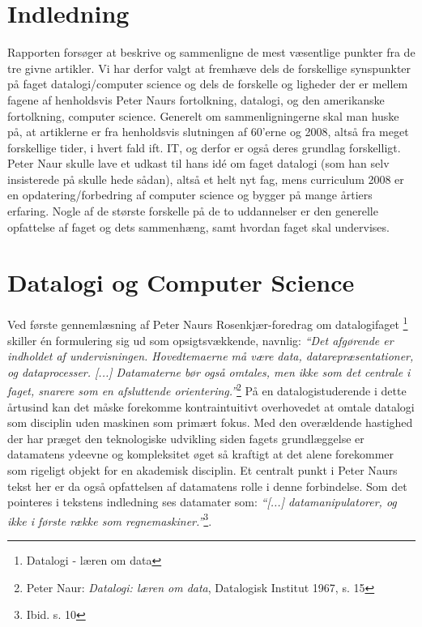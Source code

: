 \documentclass[10pt,a4paper]{article}
\newcommand{\citat}[2]{\vspace{0.1cm}\newline\textit{``#1''}\hspace{0.1cm}\footnote{#2}\vspace{0.1cm}\newline}
\begin{document}
\section{Indledning}
Rapporten forsøger at beskrive og sammenligne de mest væsentlige punkter fra de
tre givne artikler. Vi har derfor valgt at fremhæve dels de forskellige
synspunkter på faget datalogi/computer science og dels de forskelle og ligheder
der er mellem fagene af henholdsvis Peter Naurs fortolkning, datalogi, og den
amerikanske fortolkning, computer science.  Generelt om sammenligningerne skal
man huske på, at artiklerne er fra henholdsvis slutningen af 60'erne og 2008,
altså fra meget forskellige tider, i hvert fald ift. IT, og derfor er også deres
grundlag forskelligt. Peter Naur skulle lave et udkast til hans idé om faget
datalogi (som han selv insisterede på skulle hede sådan), altså et helt nyt fag,
mens curriculum 2008 er en opdatering/forbedring af computer science og bygger
på mange årtiers erfaring.  Nogle af de største forskelle på de to uddannelser
er den generelle opfattelse af faget og dets sammenhæng, samt hvordan faget skal
undervises.

\section{Datalogi og Computer Science}
Ved første gennemlæsning af Peter Naurs Rosenkjær-foredrag om datalogifaget
\footnote{Datalogi - læren om data}
skiller én formulering sig ud som opsigtsvækkende, navnlig:
\citat{Det afgørende er indholdet af undervisningen.  Hovedtemaerne må være
    data, datarepræsentationer, og dataprocesser. [...] Datamaterne bør også
    omtales, men ikke som det centrale i faget, snarere som en afsluttende
    orientering.}{Peter Naur: \emph{Datalogi: læren om data}, Datalogisk 
    Institut 1967, s. 15}
På en datalogistuderende i dette årtusind kan det
måske forekomme kontraintuitivt overhovedet at omtale datalogi som disciplin
uden maskinen som primært fokus. Med den overældende hastighed der har præget
den teknologiske udvikling siden fagets grundlæggelse er datamatens ydeevne
og kompleksitet øget så kraftigt at det alene forekommer som rigeligt objekt
for en akademisk disciplin. Et centralt punkt i Peter Naurs tekst her er da også
opfattelsen af datamatens rolle i denne forbindelse. Som det pointeres i
tekstens indledning ses datamater som:
\citat{[...] datamanipulatorer, og ikke i første række som regnemaskiner.}
{Ibid. s. 10}. 
 
\end{document}
